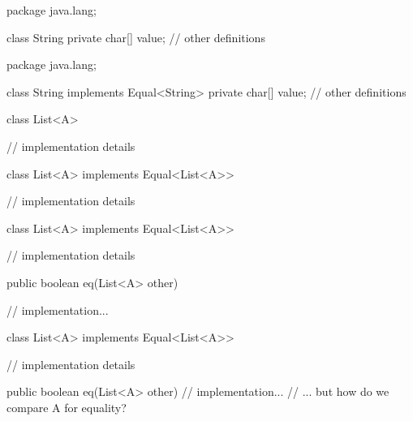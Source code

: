 \documentclass[usenames,dvipsnames,svgnames,table,aspectratio=169,mathserif]{beamer}
\begin{document}
\begin{frame}[fragile]
\begin{javacode}
package java.lang;

class String {
  private char[] value;
  // other definitions
}
\end{javacode}
\end{frame}


\begin{frame}[fragile]
\begin{javacode}
package java.lang;

class String implements Equal<String> {
  private char[] value;
  // other definitions
}
\end{javacode}
\end{frame}


\begin{frame}[fragile]
\begin{javacode}
class List<A> {
  // implementation details





}
\end{javacode}
\end{frame}


\begin{frame}[fragile]
\begin{javacode}
class List<A> implements Equal<List<A>> {
  // implementation details





}
\end{javacode}
\end{frame}


\begin{frame}[fragile]
\begin{javacode}
class List<A> implements Equal<List<A>> {
  // implementation details

  public boolean eq(List<A> other) {
    // implementation...

  }
}
\end{javacode}
\end{frame}


\begin{frame}[fragile]
\begin{javacode}
class List<A> implements Equal<List<A>> {
  // implementation details

  public boolean eq(List<A> other) {
    // implementation...
    // ... but how do we compare A for equality?
  }
}
\end{javacode}
\end{frame}
\end{document}
